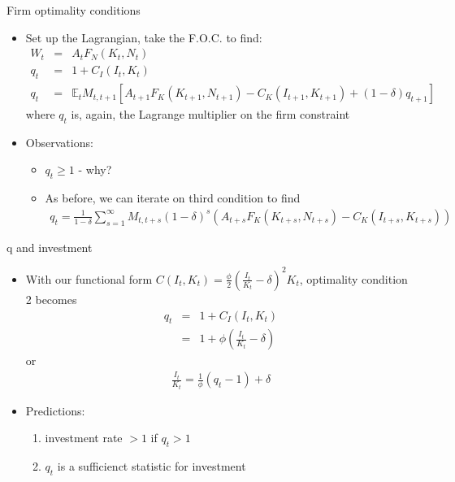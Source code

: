 \documentclass[9pt,xcolor={dvipsnames}]{beamer}
\newcommand{\bit}{\begin{itemize}}
\newcommand{\eit}{\end{itemize}}
\newcommand{\ben}{\begin{enumerate}}
\newcommand{\een}{\end{enumerate}}
\newcommand{\bc}{\color{blue}}
\begin{document}
\begin{frame}{Firm optimality conditions}

\bit
\setlength\itemsep{1.5em} 
\item Set up the Lagrangian, take the F.O.C. to find: 
\begin{eqnarray}
W_t &=& A_t F_N(K_t, N_t) \nonumber \\
q_t &=& 1+C_I(I_t, K_t) \nonumber \\
q_t &=& \mathbb E_t M_{t,t+1} \left[A_{t+1}F_K(K_{t+1}, N_{t+1}) - C_K(I_{t+1}, K_{t+1}) + (1-\delta)q_{t+1} \right] \nonumber  \nonumber
\end{eqnarray}
where $q_t$ is, again, the Lagrange multiplier on the firm constraint

\item Observations:
\bit
\setlength\itemsep{0.5em} 
\item $q_t \geq 1 $ - why?


\item As before, we can iterate on third condition to find
\begin{eqnarray}
q_t = \frac{1}{1-\delta} \sum_{s=1}^{\infty} M_{t,t+s}(1-\delta)^s \left(A_{t+s}F_K(K_{t+s}, N_{t+s}) - C_K(I_{t+s}, K_{t+s})\right) \nonumber
\end{eqnarray}
\eit

\eit

\end{frame}


\begin{frame}{q and investment}

\bit
\setlength\itemsep{1.5em} 
\item With our functional form $C(I_t, K_t) = \frac{\phi}{2} \left(\frac{I_t}{K_t}-\delta\right)^2K_t$, optimality condition 2 becomes
\begin{eqnarray}
q_t &=& 1+C_I(I_t, K_t) \nonumber \\
&=& 1 + \phi\left(\frac{I_t}{K_t} - \delta\right) \nonumber
\end{eqnarray}
or
\begin{eqnarray}
\frac{I_t}{K_t} = \frac{1}{\phi}(q_t-1)+\delta \nonumber
\end{eqnarray}

\item Predictions: 
\ben
\setlength\itemsep{0.5em} 
\item investment rate $>1$ if $q_t>1$

\item $q_t$ is a {\bc sufficienct statistic} for investment

\een


\eit

\end{frame}
\end{document}
